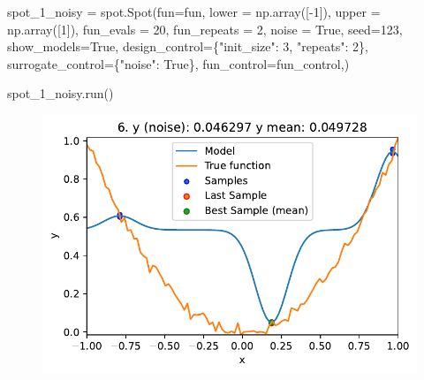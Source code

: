 \documentclass[
  letterpaper,
  DIV=11,
  numbers=noendperiod]{scrreprt}
\newenvironment{Shaded}{\begin{snugshade}}{\end{snugshade}}
\newcommand{\DecValTok}[1]{\textcolor[rgb]{0.68,0.00,0.00}{#1}}
\newcommand{\NormalTok}[1]{\textcolor[rgb]{0.00,0.23,0.31}{#1}}
\newcommand{\OperatorTok}[1]{\textcolor[rgb]{0.37,0.37,0.37}{#1}}
\newcommand{\StringTok}[1]{\textcolor[rgb]{0.13,0.47,0.30}{#1}}
\newcommand{\VariableTok}[1]{\textcolor[rgb]{0.07,0.07,0.07}{#1}}
\begin{document}
\begin{Shaded}
\begin{Highlighting}[]
\NormalTok{spot\_1\_noisy }\OperatorTok{=}\NormalTok{ spot.Spot(fun}\OperatorTok{=}\NormalTok{fun,}
\NormalTok{                   lower }\OperatorTok{=}\NormalTok{ np.array([}\OperatorTok{{-}}\DecValTok{1}\NormalTok{]),}
\NormalTok{                   upper }\OperatorTok{=}\NormalTok{ np.array([}\DecValTok{1}\NormalTok{]),}
\NormalTok{                   fun\_evals }\OperatorTok{=} \DecValTok{20}\NormalTok{,}
\NormalTok{                   fun\_repeats }\OperatorTok{=} \DecValTok{2}\NormalTok{,}
\NormalTok{                   noise }\OperatorTok{=} \VariableTok{True}\NormalTok{,}
\NormalTok{                   seed}\OperatorTok{=}\DecValTok{123}\NormalTok{,}
\NormalTok{                   show\_models}\OperatorTok{=}\VariableTok{True}\NormalTok{,}
\NormalTok{                   design\_control}\OperatorTok{=}\NormalTok{\{}\StringTok{"init\_size"}\NormalTok{: }\DecValTok{3}\NormalTok{,}
                                   \StringTok{"repeats"}\NormalTok{: }\DecValTok{2}\NormalTok{\},}
\NormalTok{                   surrogate\_control}\OperatorTok{=}\NormalTok{\{}\StringTok{"noise"}\NormalTok{: }\VariableTok{True}\NormalTok{\},}
\NormalTok{                   fun\_control}\OperatorTok{=}\NormalTok{fun\_control,)}
\end{Highlighting}
\end{Shaded}

\begin{Shaded}
\begin{Highlighting}[]
\NormalTok{spot\_1\_noisy.run()}
\end{Highlighting}
\end{Shaded}

\begin{figure}[H]

{\centering \includegraphics{08_spot_noisy_files/figure-pdf/cell-6-output-1.pdf}

}

\end{figure}
\end{document}

